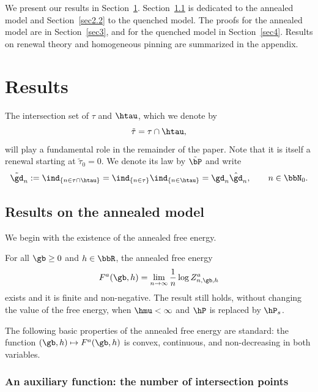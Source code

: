 We present our results in Section~\ref{sec2}. Section~\ref{sec2.1} is dedicated to the annealed model and Section~\ref{sec2.2} to the quenched model. The proofs for the annealed model are in Section~\ref{sec3}, and for the quenched model in Section~\ref{sec4}. Results on renewal theory and homogeneous pinning are summarized in the appendix.


\section{Results}\label{sec2}

The intersection set of $\tau$ and $\htau$, which we denote by
\begin{equation}\label{eq:deftildetau}
\tilde\tau = \tau \cap \htau,
\end{equation}
will play a fundamental role in the remainder of the paper. Note that it is itself a renewal starting at $\tilde\tau_0 = 0$. We denote its law by $\tilde\bP$ and write
\begin{equation}\label{eq:deftildedelta}
\tilde\gd_n := \ind_{\{n \in \tau \cap \htau\}} = \ind_{\{n \in \tau\}} \ind_{\{n \in \htau\}} = \gd_n \hat \gd_n, \qquad n \in \bbN_0.
\end{equation}

\subsection{Results on the annealed model} \label{sec2.1}

We begin with the existence of the annealed free energy.

\begin{prop}\label{pr:exist.ann.free.energy}
For all $\gb \geq 0$ and $h \in \bbR$, the annealed free energy
\begin{equation}
F^a(\gb,h) = \lim_{n \to \infty} \frac{1}{n} \log Z^a_{n,\gb,h}
\end{equation}
exists and it is finite and non-negative. The result still holds, without changing the value of the free energy, when $\hmu < \infty$ and $\hP$ is replaced by $\hP_s$.
\end{prop}

The following basic properties of the annealed free energy are standard: the function $(\gb,h) \mapsto F^a(\gb,h)$ is convex, continuous, and non-decreasing in both variables.

\subsubsection{An auxiliary function: the number of intersection points}

